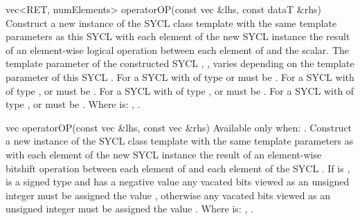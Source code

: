   \addRow
  {vec<RET, numElements> operatorOP(const vec \&lhs, const dataT \&rhs)}
  {
    Construct a new instance of the SYCL  class template with the same template parameters as this SYCL  with each element of the new SYCL  instance the result of an element-wise  logical operation between each element of   and the  scalar.
    \newline \newline
    The  template parameter of the constructed SYCL , , varies depending on the  template parameter of this SYCL . For a SYCL  with  of type  or   must be . For a SYCL  with  of type ,  or   must be . For a SYCL  with  of type ,  or   must be . For a SYCL  with  of type ,  or   must be .
    \newline \newline
    Where  is: \codeinline{\&\&}, \codeinline{\|\|}.
  }

  \addRow
  {vec operatorOP(const vec \&lhs, const vec \&rhs)}
  {
    Available only when: .
    \newline
    Construct a new instance of the SYCL  class template with the same template parameters as   with each element of the new SYCL  instance the result of an element-wise  bitshift operation between each element of   and each element of the  SYCL . If  is \codeinline{>>},  is a signed type and   has a negative value any vacated bits viewed as an unsigned integer must be assigned the value , otherwise any vacated bits viewed as an unsigned integer must be assigned the value .
    \newline \newline
    Where  is: \codeinline{<<}, \codeinline{>>}.
  }

